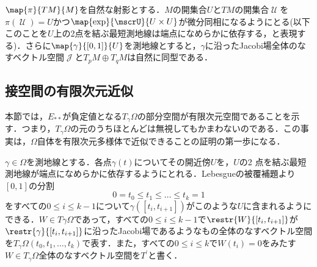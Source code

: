 \documentclass[uplatex]{jsarticle}
\begin{document}
\begin{proposition}\label{Jacobi char}
$\map{\pi}{TM}{M}$を自然な射影とする．$M$の開集合$U$と$TM$の開集合$\mscrU$を$\pi(\mscrU) = U$かつ$\map{\exp}{\mscrU}{U\times U}$が微分同相になるようにとる(以下このことを$U$上の2点を結ぶ最短測地線は端点になめらかに依存する，と表現する)．さらに$\map{\gamma}{[0,1]}{U}$を測地線とすると，$\gamma$に沿ったJacobi場全体のなすベクトル空間$\mscrJ$と$T_p M\oplus T_q M$は自然に同型である．
\end{proposition}

\subsection{接空間の有限次元近似}

本節では，$E_{\ast\ast}$が負定値となる$T_\gamma \Omega$の部分空間が有限次元空間であることを示す．つまり，$T_\gamma \Omega$の元のうちほとんどは無視してもかまわないのである．この事実は，$\Omega$自体を有限次元多様体で近似できることの証明の第一歩になる．

$\gamma\in \Omega$を測地線とする．各点$\gamma(t)$についてその開近傍$U$を，$U$の2
点を結ぶ最短測地線が端点になめらかに依存するようにとれる．Lebesgueの被覆補題より$[0,1]$の分割
\[ 0 = t_0 \leq t_1 \leq \dots \leq t_k = 1 \]
をすべての$0 \leq i \leq k-1$について$\gamma([t_i,t_{i+1}])$がこのような$U$に含まれるようにできる．$W\in T\gamma \Omega$であって，すべての$0\leq i \leq k-1$で$\restr{W}{[t_i,t_{i+1}]}$が$\restr{\gamma}{[t_i,t_{i+1}]}$に沿ったJacobi場であるようなもの全体のなすベクトル空間を$T_\gamma \Omega(t_0,t_1,\dots ,t_k)$で表す．また，すべての$0\leq i \leq k$で$W(t_i) = 0$をみたす$W\in T_\gamma \Omega$全体のなすベクトル空間を$T^\prime$と書く．
\end{document}
